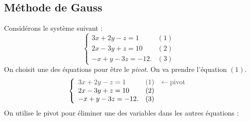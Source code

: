                         \subsection{M\'ethode de Gauss}
                              Consid\'erons le syst\`eme suivant :
                              \[
                                    \left\lbrace
                                    \begin{array}{lc}
                                          3 x + 2 y -   z =   1  & (1) \\
                                          2 x - 3 y +   z =  10  & (2) \\
                                          - x +   y - 3 z = -12. & (3)
                                    \end{array}
                                    \right.
                              \]
                              On choisit une des \'equations pour \^etre le \emph{pivot}.
                              On va prendre l'\'equation $(1)$.
                              \[
                                    \left\lbrace
	                                    \begin{array}{lcl}
	                                          \textcolor{loko1}{3 x + 2 y -   z =   1}  
	                                                & \textcolor{loko1}{(1)} 
	                                                      & \textcolor{loko1}{\leftarrow \text{pivot}} \\
	                                          2 x - 3 y +   z =  10  & (2) &            \\
	                                          - x +   y - 3 z = -12. & (3) &
	                                    \end{array}
                                    \right.
                              \]
                              On utilise le pivot pour \'eliminer une des variables dans les autres \'equations :
